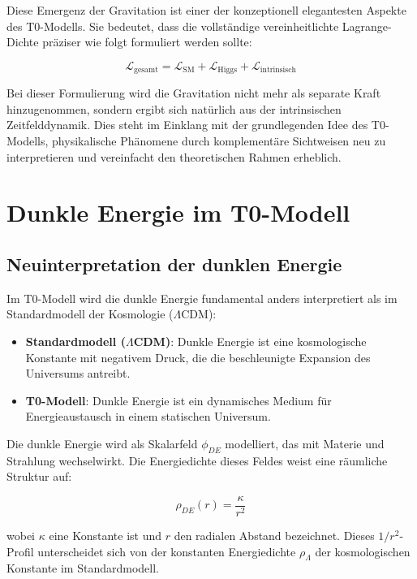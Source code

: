 \documentclass[a4paper,12pt]{article}
\theoremstyle{definition}
\theoremstyle{remark}
\begin{document}
	Diese Emergenz der Gravitation ist einer der konzeptionell elegantesten Aspekte des T0-Modells. Sie bedeutet, dass die vollständige vereinheitlichte Lagrange-Dichte präziser wie folgt formuliert werden sollte:
	
	\begin{equation}
		\mathcal{L}_\text{gesamt} = \mathcal{L}_\text{SM} + \mathcal{L}_\text{Higgs} + \mathcal{L}_\text{intrinsisch}
	\end{equation}
	
	Bei dieser Formulierung wird die Gravitation nicht mehr als separate Kraft hinzugenommen, sondern ergibt sich natürlich aus der intrinsischen Zeitfelddynamik. Dies steht im Einklang mit der grundlegenden Idee des T0-Modells, physikalische Phänomene durch komplementäre Sichtweisen neu zu interpretieren und vereinfacht den theoretischen Rahmen erheblich.
	
	\section{Dunkle Energie im T0-Modell}
	
	\subsection{Neuinterpretation der dunklen Energie}
	
	Im T0-Modell wird die dunkle Energie fundamental anders interpretiert als im Standardmodell der Kosmologie ($\Lambda$CDM):
	
	\begin{itemize}
		\item \textbf{Standardmodell ($\Lambda$CDM)}: Dunkle Energie ist eine kosmologische Konstante mit negativem Druck, die die beschleunigte Expansion des Universums antreibt.
		\item \textbf{T0-Modell}: Dunkle Energie ist ein dynamisches Medium für Energieaustausch in einem statischen Universum.
	\end{itemize}
	
	Die dunkle Energie wird als Skalarfeld $\phi_{DE}$ modelliert, das mit Materie und Strahlung wechselwirkt. Die Energiedichte dieses Feldes weist eine räumliche Struktur auf:
	
	\begin{equation}
		\rho_{DE}(r) = \frac{\kappa}{r^2}
	\end{equation}
	
	wobei $\kappa$ eine Konstante ist und $r$ den radialen Abstand bezeichnet. Dieses $1/r^2$-Profil unterscheidet sich von der konstanten Energiedichte $\rho_\Lambda$ der kosmologischen Konstante im Standardmodell.
	
\end{document}
